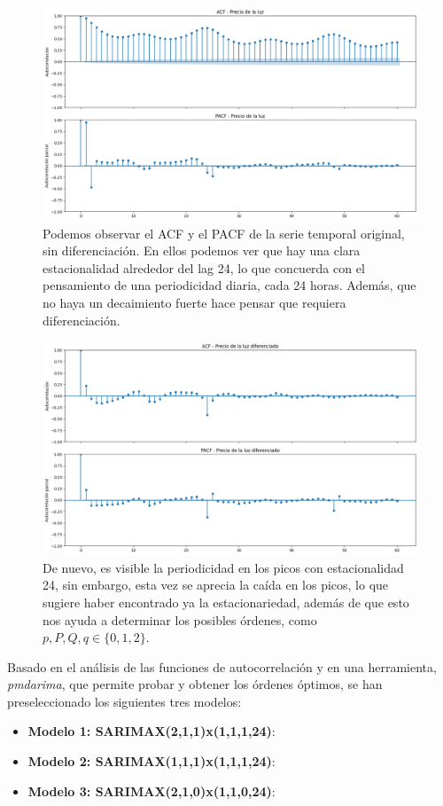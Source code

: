 \begin{figure}[H]
    \centering
    \includegraphics[width=0.60\linewidth]{figuras/ACFPACFdD0.png}
    \caption[ACF y PACF serie temporal original.]{Podemos observar el ACF y el PACF de la serie temporal original, sin diferenciación. En ellos podemos ver que hay una clara estacionalidad alrededor del lag 24, lo que concuerda con el pensamiento de una periodicidad diaria, cada 24 horas. Además, que no haya un decaimiento fuerte hace pensar que requiera diferenciación.}
    \label{ACFPACFDd0}
\end{figure}
\begin{figure}[H]
    \centering
    \includegraphics[width=0.60\linewidth]{figuras/ACFPACFdD1.png}
    \caption[ACF y PACF serie temporal diferenciada $d=D=1$.]{De nuevo, es visible la periodicidad en los picos con estacionalidad 24, sin embargo, esta vez se aprecia la caída en los picos, lo que sugiere haber encontrado ya la estacionariedad, además de que esto nos ayuda a determinar los posibles órdenes, como $p,P,Q,q \in \{0,1,2\} $.}
    \label{ACFPACFDd1}
\end{figure}

Basado en el análisis de las funciones de autocorrelación y en una herramienta, \textit{pmdarima}, que permite probar y obtener los órdenes óptimos, se han preseleccionado los siguientes tres modelos:

\begin{itemize}
    \item \textbf{Modelo 1: SARIMAX(2,1,1)x(1,1,1,24)}:


    \item \textbf{Modelo 2: SARIMAX(1,1,1)x(1,1,1,24)}:


    \item \textbf{Modelo 3: SARIMAX(2,1,0)x(1,1,0,24)}:
 
\end{itemize}

